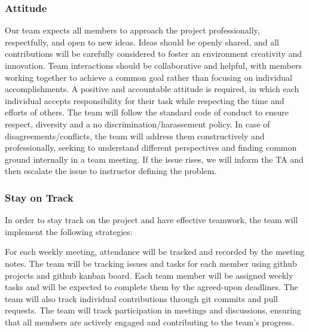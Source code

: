 \documentclass{article}
\begin{document}
\subsubsection*{Attitude}

Our team expects all members to approach the project professionally, respectfully, and open to new ideas. Ideas should be openly shared, and all contributions
will be carefully considered to foster an environment creativity and innovation. Team interactions should be collaborative and helpful, with members working together to 
achieve a common goal rather than focusing on individual accomplishments. A positive and accountable attitude is required, in which each individual accepts
responsibility for their task while respecting the time and efforts of others. The team will follow the standard code of conduct to ensure respect, diversity and a no discrimination/harassement policy.
In case of disagreements/conflicts, the team will address them constructively and professionally, seeking to understand different perspectives and finding common ground internally in a team meeting.
If the issue rises, we will inform the TA and then escalate the issue to instructor defining the problem.

\subsubsection*{Stay on Track}

In order to stay track on the project and have effective teamwork, the team will implement the following strategies:


\noindent For each weekly meeting, attendance will be tracked and recorded by the meeting notes. The team will be tracking issues and tasks for each member using 
github projects and github kanban board. Each team member will be assigned weekly tasks and will be expected to complete them by the agreed-upon deadlines. 
The team will also track individual contributions through git commits and pull requests. The team will track participation in meetings and discussions, 
ensuring that all members are actively engaged and contributing to the team's progress.
\end{document}

